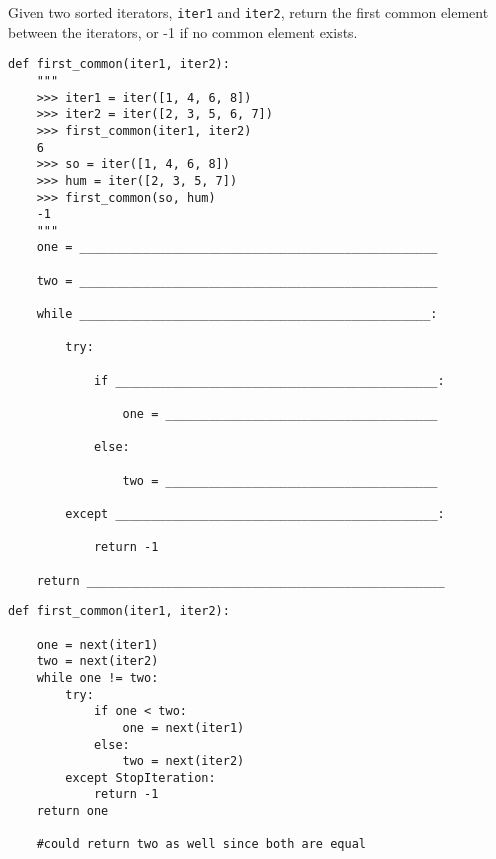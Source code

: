 \begin{blocksection}
\question Given two sorted iterators, \texttt{iter1} and  \texttt{iter2}, return the first common element between the iterators, or -1 if no common element exists.

\begin{lstlisting}
def first_common(iter1, iter2):
    """
    >>> iter1 = iter([1, 4, 6, 8])
    >>> iter2 = iter([2, 3, 5, 6, 7])
    >>> first_common(iter1, iter2)
    6
    >>> so = iter([1, 4, 6, 8])
    >>> hum = iter([2, 3, 5, 7])
    >>> first_common(so, hum)
    -1
    """
    one = __________________________________________________

    two = __________________________________________________
    
    while _________________________________________________:
    
        try:
        
            if _____________________________________________:
            
                one = ______________________________________
                
            else:
            
                two = ______________________________________
                
        except _____________________________________________:
        
            return -1
            
    return __________________________________________________
\end{lstlisting}
\end{blocksection}
\begin{blocksection}
\begin{solution}[0.6in]
\begin{lstlisting}
def first_common(iter1, iter2):

    one = next(iter1)
    two = next(iter2)
    while one != two:
        try:
            if one < two:
                one = next(iter1)
            else:
                two = next(iter2)
        except StopIteration:
            return -1
    return one 
    
    #could return two as well since both are equal
\end{lstlisting}
\end{solution}
\end{blocksection}
